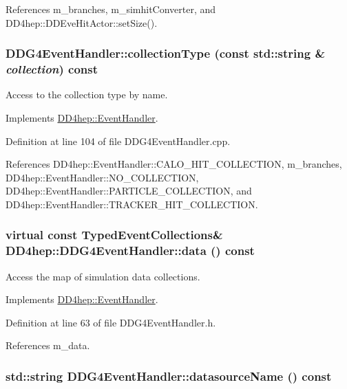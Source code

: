 References m\_\-branches, m\_\-simhitConverter, and DD4hep::DDEveHitActor::setSize().\hypertarget{class_d_d4hep_1_1_d_d_g4_event_handler_a598b723bc7b7783532343403d6b91ff2}{
\subsubsection[{collectionType}]{ DDG4EventHandler::collectionType (const std::string \& {\em collection}) const}}
\label{class_d_d4hep_1_1_d_d_g4_event_handler_a598b723bc7b7783532343403d6b91ff2}


Access to the collection type by name. 

Implements \hyperlink{class_d_d4hep_1_1_event_handler_a8424ffc2056b0e23d69c81ab2496cd51}{DD4hep::EventHandler}.

Definition at line 104 of file DDG4EventHandler.cpp.

References DD4hep::EventHandler::CALO\_\-HIT\_\-COLLECTION, m\_\-branches, DD4hep::EventHandler::NO\_\-COLLECTION, DD4hep::EventHandler::PARTICLE\_\-COLLECTION, and DD4hep::EventHandler::TRACKER\_\-HIT\_\-COLLECTION.\hypertarget{class_d_d4hep_1_1_d_d_g4_event_handler_a066893cdf431bef4b398b58624aab22c}{
\subsubsection[{data}]{\setlength{\rightskip}{0pt plus 5cm}virtual const {\bf TypedEventCollections}\& DD4hep::DDG4EventHandler::data () const}}
\label{class_d_d4hep_1_1_d_d_g4_event_handler_a066893cdf431bef4b398b58624aab22c}


Access the map of simulation data collections. 

Implements \hyperlink{class_d_d4hep_1_1_event_handler_a263d136331d72994bcbf537d4aa16d4f}{DD4hep::EventHandler}.

Definition at line 63 of file DDG4EventHandler.h.

References m\_\-data.\hypertarget{class_d_d4hep_1_1_d_d_g4_event_handler_ab5f21b250f691a4dae9b1a1deca61440}{
\subsubsection[{datasourceName}]{\setlength{\rightskip}{0pt plus 5cm}std::string DDG4EventHandler::datasourceName () const}}
\label{class_d_d4hep_1_1_d_d_g4_event_handler_ab5f21b250f691a4dae9b1a1deca61440}


